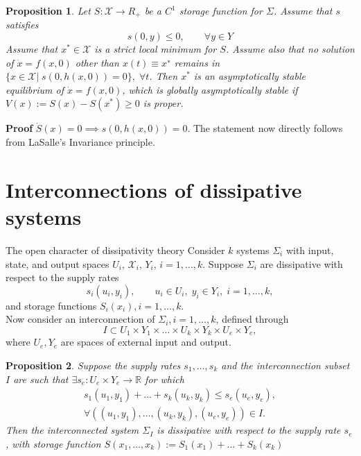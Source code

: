 \documentclass[aspectratio=169]{beamer}
\newcommand{\bbR}{\mathbb{R}}
\newtheorem{proposition}{Proposition}
\begin{document}
\begin{frame}
	\begin{proposition}
		Let  $S : \mathcal{X} \rightarrow R_+$ be a $C^1$ storage
		function for $\Sigma$. Assume that $s$ satisfies
		\begin{equation*}
			s(0, y) \le 0, \qquad \forall y \in Y
		\end{equation*}
		Assume that $x^* \in \mathcal{X}$ is a strict local minimum for $S$. Assume also that no
		solution of $\dot{x} = f (x, 0)$ other than $x(t) \equiv x^∗$ remains in $\{x \in \mathcal{X} |\; s(0, h(x, 0)) = 0\}, \; \forall t$. Then $x^*$ is an asymptotically stable equilibrium of $\dot{x} = f (x, 0)$, which is 	globally asymptotically stable if $V(x):= S(x) - S(x^*) \ge 0$ is proper.
	\end{proposition}
	\textbf{Proof}  $\dot{S}(x) = 0 \implies s(0, h(x, 0)) = 0$. The statement now directly follows from LaSalle’s Invariance
	principle.
	
\end{frame}


\section{Interconnections of dissipative systems}

\begin{frame}{The open character of dissipativity theory}
	Consider $k$ systems $\Sigma_i$  with input, state, and output spaces
	$U_i ,\, \mathcal{X}_i,\, Y_i,\,  i = 1, \dots, k$. Suppose $\Sigma_i$ are dissipative with respect to the supply rates 
	$$s_i(u_i ,y_i), \qquad u_i \in U_i, \; y_i \in Y_i,\;  i = 1, \dots, k,$$
	and storage functions $S_i(x_i), i = 1, \dots, k.$ \\
	Now consider an interconnection of $\Sigma_i, i = 1, \dots, k$, defined through
	\begin{equation*}
		I \subset U_1 \times Y_1 \times \dots \times U_k \times Y_k \times U_e \times Y_e,
	\end{equation*}
	where $U_e , Y_e$ are spaces of external input and output. 
	\begin{proposition}
		Suppose the supply rates $s_1, \dots, s_k$ and the interconnection subset $I$ are such that $\exists s_e : U_e \times Y_e \rightarrow \bbR$ for which
		\begin{equation*}
			\begin{aligned}
				s_1 (u_1, y_1) + \dots + s_k(u_k , y_k) \le s_e(u_e ,y_e), \\
				\forall ((u_1 , y_1 ), \dots, (u_k , y_k), (u_e , y_e)) \in I.
			\end{aligned}
		\end{equation*}
		Then the interconnected system $\Sigma_I$ is dissipative with respect to the supply rate $s_e$,
		with storage function $S(x_1 ,\dots, x_k) := S_1(x_1) + \dots + S_k(x_k)$
	\end{proposition}
	

\end{frame}
\end{document}
